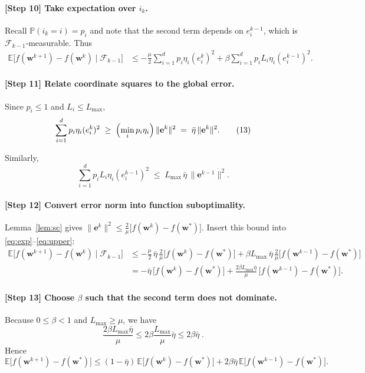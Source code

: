 \documentclass[11pt]{article}
\begin{document}
\paragraph{[Step 10] Take expectation over $i_k$.}
Recall $\mathbb P(i_k=i)=p_i$ and note that the second term depends on
$e^{k-1}_{i}$, which is $\mathcal F_{k-1}$‑measurable.
Thus
\[
\begin{aligned}
\mathbb E\!\bigl[f(\mathbf w^{k+1})-f(\mathbf w^{k})\mid \mathcal F_{k-1}\bigr]
&\le
-\frac{\mu}{2}\sum_{i=1}^{d}p_i\eta_i (e^{k}_{i})^{2}
   + \beta\sum_{i=1}^{d}p_i L_i\eta_i (e^{k-1}_{i})^{2}.
\end{aligned}
\tag{12}
\label{eq:exp}
\]

\paragraph{[Step 11] Relate coordinate squares to the global error.}
Since $p_i\le 1$ and $L_i\le L_{\max}$,
\[
\sum_{i=1}^{d}p_i\eta_i (e^{k}_{i})^{2}
\;\ge\;
\Bigl(\min_{i}p_i\eta_i\Bigr)\,\|\mathbf e^{k}\|^{2}
\;=\;
\bar\eta\,\|\mathbf e^{k}\|^{2}.
\tag{13}
\label{eq:lower}
\]

Similarly,
\[
\sum_{i=1}^{d}p_i L_i\eta_i (e^{k-1}_{i})^{2}
\;\le\;
L_{\max}\,\bar\eta\,\|\mathbf e^{k-1}\|^{2}.
\tag{14}
\label{eq:upper}
\]

\paragraph{[Step 12] Convert error norm into function suboptimality.}
Lemma~\ref{lem:sc} gives $\|\mathbf e^{k}\|^{2}\le \frac{2}{\mu}\bigl[f(\mathbf w^{k})-f(\mathbf w^{*})\bigr]$.
Insert this bound into \eqref{eq:exp}–\eqref{eq:upper}:
\[
\begin{aligned}
\mathbb E\!\bigl[f(\mathbf w^{k+1})-f(\mathbf w^{k})\mid \mathcal F_{k-1}\bigr]
&\le
-\frac{\mu}{2}\,\bar\eta\,
      \frac{2}{\mu}\bigl[f(\mathbf w^{k})-f(\mathbf w^{*})\bigr]
   + \beta L_{\max}\,\bar\eta\,
      \frac{2}{\mu}\bigl[f(\mathbf w^{k-1})-f(\mathbf w^{*})\bigr] \\[4pt]
&= -\bar\eta\,
   \bigl[f(\mathbf w^{k})-f(\mathbf w^{*})\bigr]
   + \frac{2\beta L_{\max}\bar\eta}{\mu}\,
   \bigl[f(\mathbf w^{k-1})-f(\mathbf w^{*})\bigr].
\end{aligned}
\tag{15}
\label{eq:recursion}
\]

\paragraph{[Step 13] Choose $\beta$ such that the second term does not dominate.}
Because $0\le\beta<1$ and $L_{\max}\ge\mu$, we have
\[
\frac{2\beta L_{\max}\bar\eta}{\mu}\le 2\beta\frac{L_{\max}}{\mu}\bar\eta
\le 2\beta\bar\eta\; .
\]
Hence
\[
\mathbb E\!\bigl[f(\mathbf w^{k+1})-f(\mathbf w^{*})\bigr]
\le (1-\bar\eta)\,
   \mathbb E\!\bigl[f(\mathbf w^{k})-f(\mathbf w^{*})\bigr]
   + 2\beta\bar\eta\,
   \mathbb E\!\bigl[f(\mathbf w^{k-1})-f(\mathbf w^{*})\bigr].
\tag{16}
\label{eq:simple}
\]
\end{document}
